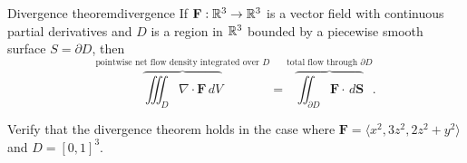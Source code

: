 \documentclass[svgnames]{report}
\begin{document}
\begin{theo}{Divergence theorem}{divergence}
  If $\mathbf{F} : \mathbb{R}^3 \to \mathbb{R}^3$ is a vector field with continuous
  partial derivatives and $D$ is a region in $\mathbb{R}^3$ bounded by a
  piecewise smooth surface $S = \partial D$, then 
  \[
    \overbrace{\iiint_D \nabla \cdot \mathbf{F} \,
      dV}^{\text{pointwise net flow density
        integrated over $D$}} = \overbrace{\iint_{\partial D}
    \mathbf{F} \cdot \, d\mathbf{S}}^{\text{total flow through
      $\partial D$}}. 
  \]
\end{theo}

\begin{example}{}{}
  Verify that the divergence theorem holds in the case where
  $\mathbf{F} = \langle x^2, 3z^2, 2z^2 + y^2 \rangle$ and $D = [0,1]^3$. 
\end{example}
\end{document}
